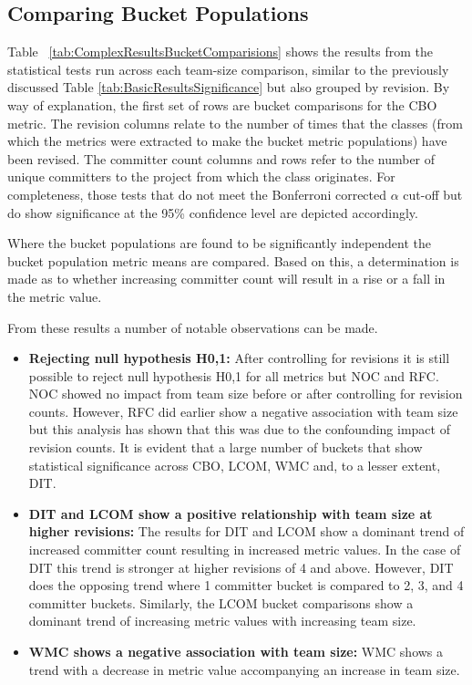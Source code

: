 \subsection{Comparing Bucket Populations}
Table ~\ref{tab:ComplexResultsBucketComparisions} shows the results from the statistical tests run across each team-size comparison, similar to the previously discussed Table \ref{tab:BasicResultsSignificance} but also grouped by revision. By way of explanation, the first set of rows are bucket comparisons for the CBO metric. The revision columns relate to the number of times that the classes (from which the metrics were extracted to make the bucket metric populations) have been revised. The committer count columns and rows refer to the number of unique committers to the project from which the class originates. For completeness, those tests that do not meet the Bonferroni corrected $\alpha$ cut-off but do show significance at the 95\% confidence level are depicted accordingly. 

Where the bucket populations are found to be significantly independent the bucket population metric means are compared. Based on this, a determination is made as to whether increasing committer count will result in a rise or a fall in the metric value.

From these results a number of notable observations can be made. 

\begin{itemize}
\item  \textbf{Rejecting null hypothesis H0,1:} After controlling for revisions it is still possible to reject null hypothesis H0,1 for all metrics but NOC and RFC. NOC showed no impact from team size before or after controlling for revision counts. However, RFC did earlier show a negative association with team size but this analysis has shown that this was due to the confounding impact of revision counts.  It is evident that a large number of buckets that show statistical significance across CBO, LCOM, WMC and, to a lesser extent, DIT.

\item  \textbf{DIT and LCOM show a positive relationship with team size at higher revisions:} The results for DIT and LCOM show a dominant trend of increased committer count resulting in increased metric values. In the case of DIT this trend is stronger at higher revisions of 4 and above. However, DIT does the opposing trend where 1 committer bucket is compared to 2, 3, and 4 committer buckets. Similarly, the LCOM bucket comparisons show a dominant trend of increasing metric values with increasing team size.

\item  \textbf{WMC shows a negative association with team size:} WMC shows a  trend with a decrease in metric value accompanying an increase in team size. 
\end{itemize}

